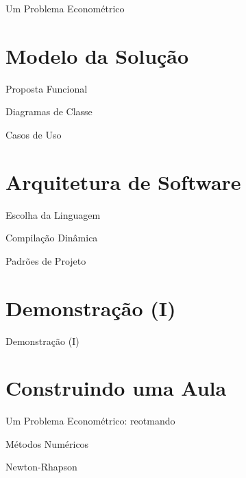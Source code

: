 \documentclass{beamer}
\begin{document}
\begin{frame}{Um Problema Econométrico}
\end{frame}

\section{Modelo da Solução}

\begin{frame}{Proposta Funcional}
\end{frame}

\begin{frame}{Diagramas de Classe}
\end{frame}

\begin{frame}{Casos de Uso}
\end{frame}

\section{Arquitetura de Software}

\begin{frame}{Escolha da Linguagem}
\end{frame}

\begin{frame}{Compilação Dinâmica}
\end{frame}

\begin{frame}{Padrões de Projeto}
\end{frame}

\section{Demonstração (I)}
\begin{frame}{Demonstração (I)}
\end{frame}

\section{Construindo uma Aula}

\begin{frame}{Um Problema Econométrico: reotmando}
\end{frame}

\begin{frame}{Métodos Numéricos}
\end{frame}

\begin{frame}{Newton-Rhapson}
\end{frame}
\end{document}
